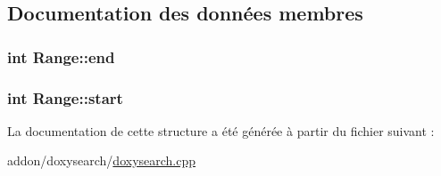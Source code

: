 \subsection{Documentation des données membres}
\hypertarget{struct_range_a680587bf22a9bf01b6662c53de90ea97}{}
\subsubsection[{end}]{\setlength{\rightskip}{0pt plus 5cm}int Range\+::end}\label{struct_range_a680587bf22a9bf01b6662c53de90ea97}
\hypertarget{struct_range_afbb98f5d1cbe46d8b49f75322a2f253f}{}
\subsubsection[{start}]{\setlength{\rightskip}{0pt plus 5cm}int Range\+::start}\label{struct_range_afbb98f5d1cbe46d8b49f75322a2f253f}


La documentation de cette structure a été générée à partir du fichier suivant \+:\begin{DoxyCompactItemize}
\item 
addon/doxysearch/\hyperlink{doxysearch_8cpp}{doxysearch.\+cpp}\end{DoxyCompactItemize}
